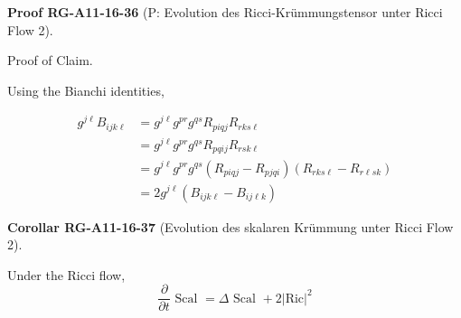 \documentclass[10pt, letterpaper]{article}
\newcommand{\CustomHeading}[3]{%
  \par\medskip\noindent%
  \textbf{#1 #2} \textnormal{(#3)}.\enskip%
}
\newenvironment{KORO}[2]{\CustomHeading{Corollar}{#1}{#2}}{}
\newenvironment{PROOF}[2]{\CustomHeading{Proof}{#1}{#2}}{}
\begin{document}
\begin{PROOF}{RG-A11-16-36}{P: Evolution des Ricci-Krümmungstensor unter Ricci Flow 2}
Proof of Claim. 

Using the Bianchi identities,

$$\begin{aligned}
g^{j \ell} B_{i j k \ell} & =g^{j \ell} g^{p r} g^{q s} R_{p i q j} R_{r k s \ell} \\
& =g^{j \ell} g^{p r} g^{q s} R_{p q i j} R_{r s k \ell} \\
& =g^{j \ell} g^{p r} g^{q s}\left(R_{p i q j}-R_{p j q i}\right)\left(R_{r k s \ell}-R_{r \ell s k}\right) \\
& =2 g^{j \ell}\left(B_{i j k \ell}-B_{i j \ell k}\right)
\end{aligned}$$
\end{PROOF}

\begin{KORO}{RG-A11-16-37}{Evolution des skalaren Krümmung unter Ricci Flow 2}
Under the Ricci flow,
$$
\frac{\partial}{\partial t} \text { Scal }=\Delta \text { Scal }+2  |\text{Ric}|^{2}
$$
\end{KORO}
\end{document}
